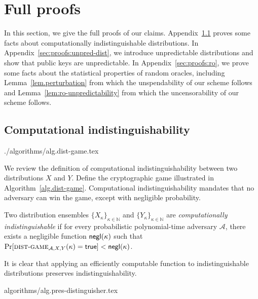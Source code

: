 \section{Full proofs}\label{sec:proofs}

In this section, we give the full proofs of our claims.
Appendix~\ref{sec:proofs:comp-ind} proves some facts about
computationally indistinguishable distributions. In
Appendix~\ref{sec:proofs:unpred-dist}, we introduce unpredictable distributions
and show that public keys are unpredictable. In Appendix~\ref{sec:proofs:ro},
we prove some facts about the statistical properties of random oracles,
including Lemma~\ref{lem.perturbation} from which the unspendability of our
scheme follows and Lemma~\ref{lem:ro-unpredictability} from which the
uncensorability of our scheme follows.

\subsection{Computational indistinguishability}\label{sec:proofs:comp-ind}

{./algorithms/alg.dist-game.tex}

We review the definition of computational indistinguishability between two
distributions $X$ and $Y$. Define the cryptographic game illustrated in
Algorithm~\ref{alg.dist-game}.
Computational indistinguishability mandates that no adversary can win the game,
except with negligible probability.

\begin{definition}
  Two distribution ensembles $\{X_\kappa\}_{\kappa\in\mathbb{N}}$ and $\{Y_\kappa\}_{\kappa\in\mathbb{N}}$ are
  \emph{computationally indistinguishable}
  if for every probabilistic polynomial-time adversary $\mathcal{A}$,
  there exists a negligible function $\textsf{negl}(\kappa)$ such that
  $\Pr[\textsc{dist}\-\text{-}\-\textsc{game}_{\mathcal{A},X,Y}(\kappa) = \mathsf{true}] < \textsf{negl}(\kappa)$.
\end{definition}

It is clear that applying an efficiently computable function to
indistinguishable distributions preserves indistinguishability.

{algorithms/alg.pres-distinguisher.tex}

